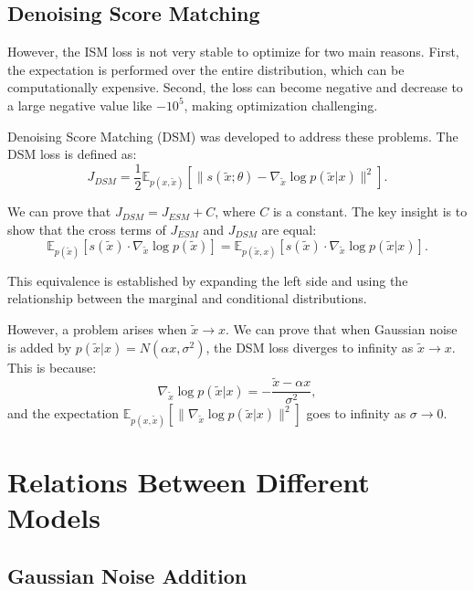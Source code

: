 \subsection{Denoising Score Matching}

However, the ISM loss is not very stable to optimize for two main reasons. First, the expectation is performed over the entire distribution, which can be computationally expensive. Second, the loss can become negative and decrease to a large negative value like $-10^5$, making optimization challenging.

Denoising Score Matching (DSM) was developed to address these problems. The DSM loss is defined as:
\begin{equation}
J_{DSM} = \frac{1}{2}\mathbb{E}_{p(x,\tilde{x})}\left[\|s(\tilde{x};\theta) - \nabla_{\tilde{x}}\log p(\tilde{x}|x)\|^2\right].
\end{equation}

We can prove that $J_{DSM} = J_{ESM} + C$, where $C$ is a constant. The key insight is to show that the cross terms of $J_{ESM}$ and $J_{DSM}$ are equal:
\begin{equation}
\mathbb{E}_{p(\tilde{x})}[s(\tilde{x}) \cdot \nabla_{\tilde{x}}\log p(\tilde{x})] = \mathbb{E}_{p(\tilde{x},x)}\left[s(\tilde{x}) \cdot \nabla_{\tilde{x}} \log p(\tilde{x}|x)\right].
\end{equation}

This equivalence is established by expanding the left side and using the relationship between the marginal and conditional distributions.

However, a problem arises when $\tilde{x} \to x$. We can prove that when Gaussian noise is added by $p(\tilde{x}|x) = N(\alpha x, \sigma^2)$, the DSM loss diverges to infinity as $\tilde{x} \to x$. This is because:
\begin{equation}
\nabla_{\tilde{x}}\log p(\tilde{x}|x) = -\frac{\tilde{x}-\alpha x}{\sigma^2},
\end{equation}
and the expectation $\mathbb{E}_{p(x,\tilde{x})}[\|\nabla_{\tilde{x}}\log p(\tilde{x}|x)\|^2]$ goes to infinity as $\sigma \to 0$.

\section{Relations Between Different Models}

\subsection{Gaussian Noise Addition}

